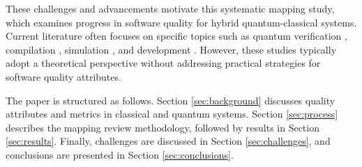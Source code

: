 These challenges and advancements motivate this systematic mapping study, which examines progress in software quality for hybrid quantum-classical systems. Current literature often focuses on specific topics such as quantum verification \cite{22}, compilation \cite{Campbell2018}, simulation \cite{25}, and development \cite{26}. However, these studies typically adopt a theoretical perspective without addressing practical strategies for software quality attributes. %

The paper is structured as follows. Section \ref{sec:background} discusses quality attributes and metrics in classical and quantum systems. Section \ref{sec:process} describes the mapping review methodology, followed by results in Section \ref{sec:results}. Finally, challenges are discussed in Section \ref{sec:challenges}, and conclusions are presented in Section \ref{sec:conclusions}.
